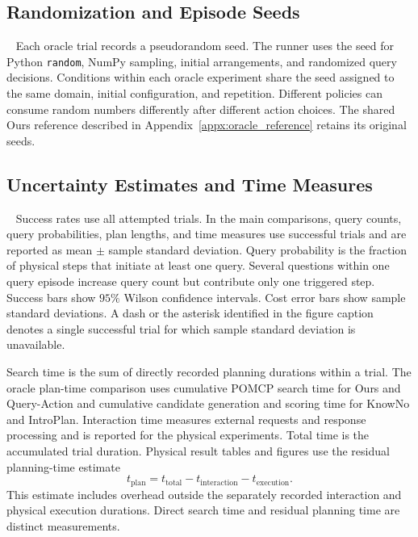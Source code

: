 \subsection{Randomization and Episode Seeds}~\label{appx:randomization}
Each oracle trial records a pseudorandom seed. The runner uses the seed for Python \texttt{random}, NumPy sampling, initial arrangements, and randomized query decisions. Conditions within each oracle experiment share the seed assigned to the same domain, initial configuration, and repetition. Different policies can consume random numbers differently after different action choices. The shared Ours reference described in Appendix~\ref{appx:oracle_reference} retains its original seeds.

\subsection{Uncertainty Estimates and Time Measures}~\label{appx:metric_details}
Success rates use all attempted trials. In the main comparisons, query counts, query probabilities, plan lengths, and time measures use successful trials and are reported as mean $\pm$ sample standard deviation. Query probability is the fraction of physical steps that initiate at least one query. Several questions within one query episode increase query count but contribute only one triggered step. Success bars show $95\%$ Wilson confidence intervals. Cost error bars show sample standard deviations. A dash or the asterisk identified in the figure caption denotes a single successful trial for which sample standard deviation is unavailable.

Search time is the sum of directly recorded planning durations within a trial. The oracle plan-time comparison uses cumulative POMCP search time for Ours and Query-Action and cumulative candidate generation and scoring time for KnowNo and IntroPlan. Interaction time measures external requests and response processing and is reported for the physical experiments. Total time is the accumulated trial duration. Physical result tables and figures use the residual planning-time estimate
\[
t_{\mathrm{plan}}=t_{\mathrm{total}}-t_{\mathrm{interaction}}-t_{\mathrm{execution}}.
\]
This estimate includes overhead outside the separately recorded interaction and physical execution durations. Direct search time and residual planning time are distinct measurements.



